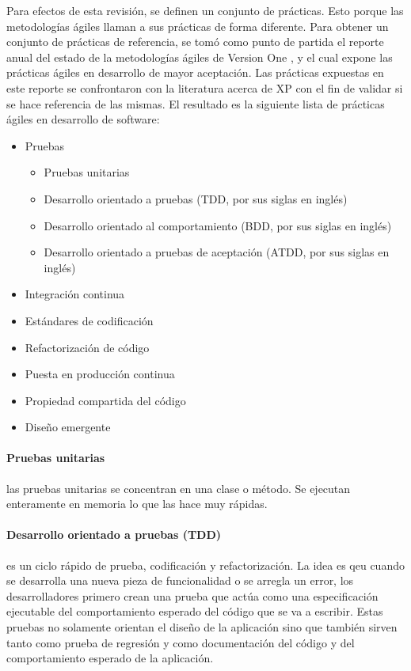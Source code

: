 Para efectos de esta revisión, se definen un conjunto de prácticas. Esto porque las metodologías ágiles llaman a sus prácticas de forma diferente. Para obtener un conjunto de prácticas de referencia, se tomó como punto de partida el reporte anual del estado de la metodologías ágiles de Version One \cite{version-one}, y el cual expone las prácticas ágiles en desarrollo de mayor aceptación. Las prácticas expuestas en este reporte se confrontaron con la literatura acerca de XP \cite{beck-andres, ford, shore-warden} con el fin de validar si se hace referencia de las mismas. El resultado es la siguiente lista de prácticas ágiles en desarrollo de software:
\begin{itemize}
    \item Pruebas
        \begin{itemize}
            \item Pruebas unitarias
            \item Desarrollo orientado a pruebas (TDD, por sus siglas en inglés)
            \item Desarrollo orientado al comportamiento (BDD, por sus siglas en inglés)
            \item Desarrollo orientado a pruebas de aceptación (ATDD, por sus siglas en inglés)
        \end{itemize}
        \item Integración continua
        \item Estándares de codificación
        \item Refactorización de código
        \item Puesta en producción continua
        \item Propiedad compartida del código
        \item Diseño emergente
\end{itemize}

\paragraph{Pruebas unitarias} las pruebas unitarias se concentran en una clase o método. Se ejecutan enteramente en memoria lo que las hace muy rápidas\cite{shore-warden}.

\paragraph{Desarrollo orientado a pruebas (TDD)} es un ciclo rápido de prueba, codificación y refactorización\cite{shore-warden}. La idea es qeu cuando se desarrolla una nueva pieza de funcionalidad o se arregla un error, los desarrolladores primero crean una prueba que actúa como una especificación ejecutable del comportamiento esperado del código que se va a escribir. Estas pruebas no solamente orientan el diseño de la aplicación sino que también sirven tanto como prueba de regresión y como documentación del código y del comportamiento esperado de la aplicación.\cite{humble}

